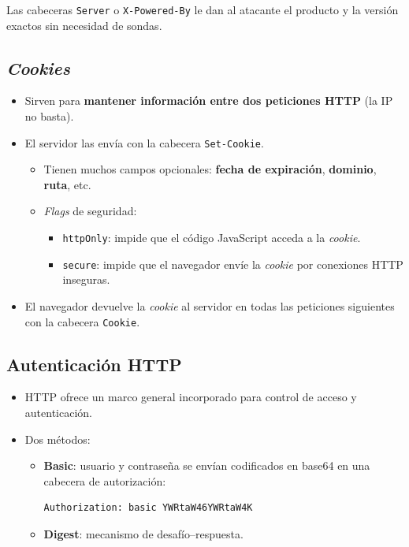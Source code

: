 \documentclass[11pt,a4paper]{report}
\begin{document}
\noindent Las cabeceras \texttt{Server} o \texttt{X-Powered-By} le dan al atacante el producto y la versión exactos sin necesidad de sondas.
 
\subsection{\emph{Cookies}}
 
\begin{itemize}
  \item Sirven para \textbf{mantener información entre dos peticiones HTTP} (la IP no basta).
  \item El servidor las envía con la cabecera \texttt{Set-Cookie}.
    \begin{itemize}
      \item Tienen muchos campos opcionales: \textbf{fecha de expiración}, \textbf{dominio}, \textbf{ruta}, etc.
      \item \emph{Flags} de seguridad:
        \begin{itemize}
          \item \texttt{httpOnly}: impide que el código JavaScript acceda a la \emph{cookie}.
          \item \texttt{secure}: impide que el navegador envíe la \emph{cookie} por conexiones HTTP inseguras.
        \end{itemize}
    \end{itemize}
  \item El navegador devuelve la \emph{cookie} al servidor en todas las peticiones siguientes con la cabecera \texttt{Cookie}.
\end{itemize}
 
\subsection{Autenticación HTTP}
 
\begin{itemize}
  \item HTTP ofrece un marco general incorporado para control de acceso y autenticación.
  \item Dos métodos:
    \begin{itemize}
      \item \textbf{Basic}: usuario y contraseña se envían codificados en base64 en una cabecera de autorización:
\begin{verbatim}
Authorization: basic YWRtaW46YWRtaW4K
\end{verbatim}
      \item \textbf{Digest}: mecanismo de desafío--respuesta.
    \end{itemize}
\end{itemize}
 
\end{document}
